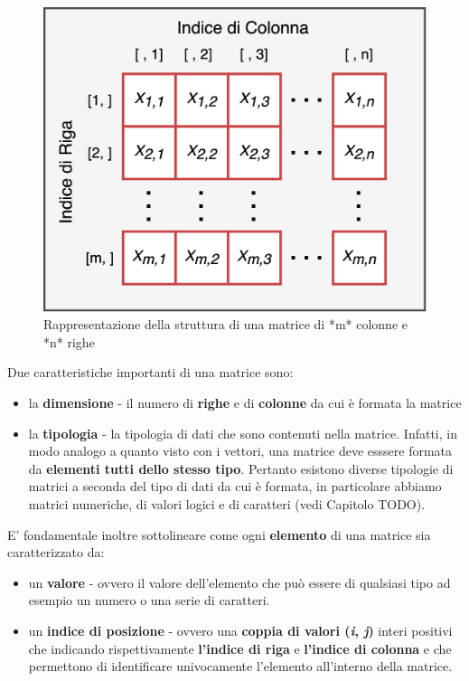 \documentclass[
]{book}
\providecommand{\tightlist}{%
  \setlength{\itemsep}{0pt}\setlength{\parskip}{0pt}}
\begin{document}
\begin{figure}

{\centering \includegraphics[width=0.75\linewidth]{images/matrix} 

}

\caption{Rappresentazione della struttura di una matrice di *m* colonne e *n* righe}\label{fig:matrix}
\end{figure}

Due caratteristiche importanti di una matrice sono:

\begin{itemize}
\tightlist
\item
  la \textbf{dimensione} - il numero di \textbf{righe} e di \textbf{colonne} da cui è formata la matrice
\item
  la \textbf{tipologia} - la tipologia di dati che sono contenuti nella matrice. Infatti, in modo analogo a quanto visto con i vettori, una matrice deve esssere formata da \textbf{elementi tutti dello stesso tipo}. Pertanto esistono diverse tipologie di matrici a seconda del tipo di dati da cui è formata, in particolare abbiamo matrici numeriche, di valori logici e di caratteri (vedi Capitolo TODO).
\end{itemize}

E' fondamentale inoltre sottolineare come ogni \textbf{elemento} di una matrice sia caratterizzato da:

\begin{itemize}
\tightlist
\item
  un \textbf{valore} - ovvero il valore dell'elemento che può essere di qualsiasi tipo ad esempio un numero o una serie di caratteri.
\item
  un \textbf{indice di posizione} - ovvero una \textbf{coppia di valori (\emph{i}, \emph{j})} interi positivi che indicando rispettivamente \textbf{l'indice di riga} e \textbf{l'indice di colonna} e che permettono di identificare univocamente l'elemento all'interno della matrice.
\end{itemize}
\end{document}
